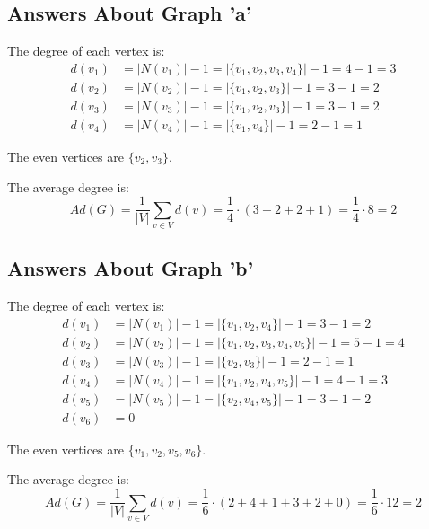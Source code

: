 \documentclass{article}
\begin{document}
    
    \subsection{Answers About Graph 'a'}
    The degree of each vertex is:
    \begin{align*}
    d(v_{1}) &= |N(v_{1})|-1 =|\{v_{1},v_{2},v_{3},v_{4}\}|-1 = 4 - 1 = 3\\
    d(v_{2}) &= |N(v_{2})|-1 =|\{v_{1},v_{2},v_{3}\}|-1 = 3 - 1 = 2\\
    d(v_{3}) &= |N(v_{3})|-1 =|\{v_{1},v_{2},v_{3}\}|-1 = 3 - 1 = 2 \\
    d(v_{4}) &= |N(v_{4})|-1 =|\{v_{1},v_{4}\}|-1 = 2 - 1 = 1
    \end{align*}

    \par\noindent The even vertices are \(\{v_{2},v_{3}\}\).\newline
    
    \par\noindent The average degree is:
    \[
    Ad(G) = \frac{1}{|V|} \sum_{v \in V} d(v) = \frac{1}{4} \cdot (3+2+2+1) = \frac{1}{4} \cdot 8 = 2
    \]
    
    \subsection{Answers About Graph 'b'}
    The degree of each vertex is:
    \begin{align*}
    d(v_{1}) &= |N(v_{1})|-1 =|\{v_{1},v_{2},v_{4}\}|-1 = 3 - 1 = 2\\
    d(v_{2}) &= |N(v_{2})|-1 =|\{v_{1},v_{2},v_{3},v_{4},v_{5}\}|-1 = 5 - 1 = 4\\
    d(v_{3}) &= |N(v_{3})|-1 =|\{v_{2},v_{3}\}|-1 = 2 - 1 = 1 \\
    d(v_{4}) &= |N(v_{4})|-1 =|\{v_{1},v_{2},v_{4},v_{5}\}|-1 = 4 - 1 = 3 \\
    d(v_{5}) &= |N(v_{5})|-1 =|\{v_{2},v_{4},v_{5}\}|-1 = 3 - 1 = 2 \\
    d(v_{6}) &= 0
    \end{align*}

    \par\noindent The even vertices are \(\{v_{1},v_{2},v_{5},v_{6}\}\).\newline
    
    \par\noindent The average degree is:
    \[
    Ad(G) = \frac{1}{|V|} \sum_{v \in V} d(v) = \frac{1}{6} \cdot (2+4+1+3+2+0) = \frac{1}{6} \cdot 12 = 2
    \]
    
\end{document}
